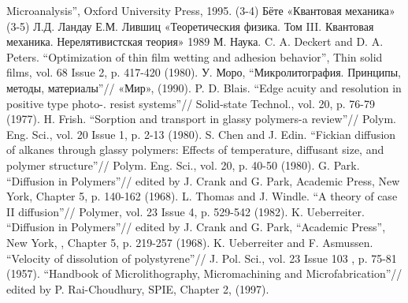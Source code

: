 \begin{thebibliography}{99}
Microanalysis'', Oxford University Press, 1995.
    \bibitem{} (3-4) Бёте «Квантовая механика»
    \bibitem{} (3-5) Л.Д. Ландау Е.М. Лившиц «Теоретическия физика. Том III.
Квантовая механика. Нерелятивистская теория» 1989 М. Наука.
    \bibitem{} C. A. Deckert and D. A. Peters. ``Optimization of thin film wetting and
adhesion behavior'', Thin solid films, vol. 68 Issue 2, p. 417-420 (1980).
    \bibitem{} У. Моро, ``Микролитография. Принципы, методы, материалы''//
«Мир», (1990).
    \bibitem{} P. D. Blais. ``Edge acuity and resolution in positive type photo-. resist
systems''// Solid-state Technol., vol. 20, p. 76-79 (1977).
    \bibitem{} H. Frish. ``Sorption and transport in glassy polymers-a review''// Polym.
Eng. Sci., vol. 20 Issue 1, p. 2-13 (1980).
    \bibitem{} S. Chen and J. Edin. ``Fickian diffusion of alkanes through glassy
polymers: Effects of temperature, diffusant size, and polymer structure''//
Polym. Eng. Sci., vol. 20, p. 40-50 (1980).
    \bibitem{} G. Park. ``Diffusion in Polymers''// edited by J. Crank and G. Park,
Academic Press, New York, Chapter 5, p. 140-162 (1968).
    \bibitem{} L. Thomas and J. Windle. ``A theory of case II diffusion''// Polymer, vol.
23 Issue 4, p. 529-542 (1982).
    \bibitem{} K. Ueberreiter. ``Diffusion in Polymers''// edited by J. Crank and G. Park, ``Academic Press'', New York, , Chapter 5, p. 219-257 (1968).
    \bibitem{} K. Ueberreiter and F. Asmussen. ``Velocity of dissolution of
polystyrene''// J. Pol. Sci., vol. 23 Issue 103 , p. 75-81 (1957).
    \bibitem{} ``Handbook of Microlithography, Micromachining and Microfabrication''// edited by P. Rai-Choudhury, SPIE, Chapter 2, (1997).
\end{thebibliography}
